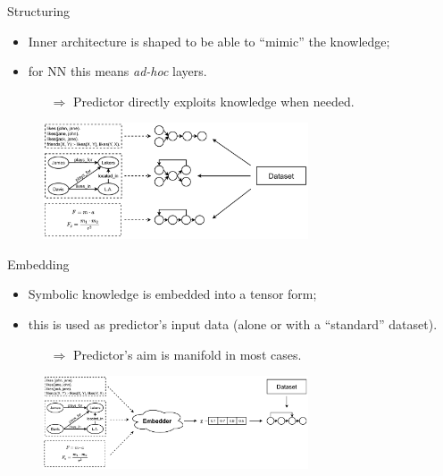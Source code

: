 \documentclass[presentation]{beamer}\mode<presentation>{\usetheme{AMSBolognaFC}}
\begin{document}
\begin{frame}[c]{Structuring}
    \begin{itemize}
        \item Inner architecture is shaped to be able to ``mimic'' the knowledge;
        \item for NN this means \emph{ad-hoc} layers.
        \begin{itemize}
            \item[$\Rightarrow$] Predictor directly exploits knowledge when needed.
        \end{itemize} 
    \end{itemize}
    
    \begin{figure}
        \centering
        \includegraphics[width=0.7\textwidth]{figures/ski-structuring}
    \end{figure}
\end{frame}

\begin{frame}[c]{Embedding}
    \begin{itemize}
        \item Symbolic knowledge is embedded into a tensor form;
        \item this is used as predictor's input data (alone or with a ``standard'' dataset).
        \begin{itemize}
            \item[$\Rightarrow$] Predictor's aim is manifold in most cases.
        \end{itemize} 
    \end{itemize}
    
    \begin{figure}
        \centering
        \includegraphics[width=0.7\textwidth]{figures/ski-embedding}
    \end{figure}
\end{frame}
\end{document}

